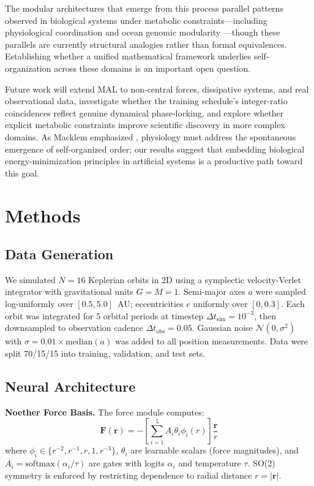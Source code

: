 \documentclass[9pt,twocolumn,twoside]{pnas-new}
\begin{document}
The modular architectures that emerge from this process parallel patterns observed in biological systems under metabolic constraints---including physiological coordination \cite{Hoyer2001} and ocean genomic modularity \cite{Sunagawa2015, Clune2013}---though these parallels are currently structural analogies rather than formal equivalences. Establishing whether a unified mathematical framework underlies self-organization across these domains is an important open question.

Future work will extend MAL to non-central forces, dissipative systems, and real observational data, investigate whether the training schedule's integer-ratio coincidences reflect genuine dynamical phase-locking, and explore whether explicit metabolic constraints improve scientific discovery in more complex domains. As Macklem emphasized \cite{Macklem2008}, physiology must address the spontaneous emergence of self-organized order; our results suggest that embedding biological energy-minimization principles in artificial systems is a productive path toward this goal.

\section*{Methods}

\subsection*{Data Generation}
We simulated $N=16$ Keplerian orbits in 2D using a symplectic velocity-Verlet integrator with gravitational units $G = M = 1$. Semi-major axes $a$ were sampled log-uniformly over $[0.5, 5.0]$~AU; eccentricities $e$ uniformly over $[0, 0.3]$. Each orbit was integrated for 5 orbital periods at timestep $\Delta t_{\text{sim}} = 10^{-3}$, then downsampled to observation cadence $\Delta t_{\text{obs}} = 0.05$. Gaussian noise $\mathcal{N}(0, \sigma^2)$ with $\sigma = 0.01 \times \text{median}(a)$ was added to all position measurements. Data were split 70/15/15 into training, validation, and test sets.

\subsection*{Neural Architecture}
\textbf{Noether Force Basis.} The force module computes:
\begin{equation}
\mathbf{F}(\mathbf{r}) = -\left[\sum_{i=1}^5 A_i \theta_i \phi_i(r)\right] \frac{\mathbf{r}}{r}
\end{equation}
where $\phi_i \in \{r^{-2}, r^{-1}, r, 1, r^{-3}\}$, $\theta_i$ are learnable scalars (force magnitudes), and $A_i = \mathrm{softmax}(\alpha_i / \tau)$ are gates with logits $\alpha_i$ and temperature $\tau$. SO(2) symmetry is enforced by restricting dependence to radial distance $r = |\mathbf{r}|$.
\end{document}
